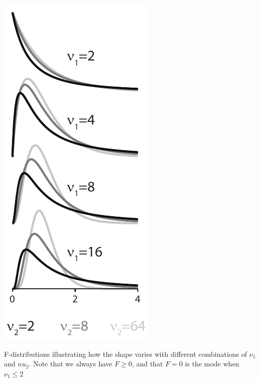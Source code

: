 \documentclass{tufte-handout}
\begin{document}
\begin{marginfigure}[10pt]
  \includegraphics[width=\linewidth]{handout4_fpdf}%
  \label{fig:fullfig}%
  \caption{F-distributions illustrating how the shape varies with different combinations of $\nu_1$ and $nu_2$. Note that we always have $F \geq 0$, and that $F=0$ is the mode when $\nu_1\leq 2$}
\end{marginfigure}
\end{document}
